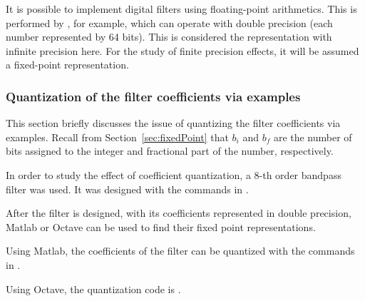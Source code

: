 It is possible to implement digital filters using floating-point arithmetics. This is performed by {\matlab}, for example, which can operate with double precision (each number represented by 64 bits). This is considered the representation with infinite precision here. For the study of finite precision effects, it will be assumed a fixed-point representation.

\subsubsection{Quantization of the filter coefficients via examples}

This section briefly discusses the issue of quantizing the filter coefficients via examples. Recall from Section~\ref{sec:fixedPoint} that $b_i$ and $b_f$ are the number of bits assigned to the integer and fractional part of the number, respectively.

In order to study the effect of coefficient quantization, a 8-th order bandpass filter was used. It was designed with the commands in .


After the filter is designed, with its coefficients represented in double precision, Matlab or Octave can be used to find their fixed point representations.

Using Matlab, the coefficients of the filter can be quantized with the commands in .


Using Octave, the quantization code is .


